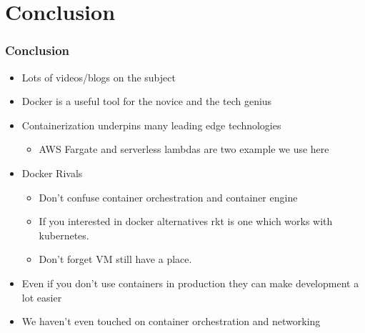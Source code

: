 \documentclass{beamer}
\begin{document}
\section{Conclusion} 
\begin{frame}
    \small
    \frametitle{Conclusion}
    \begin{itemize}
        \item Lots of videos/blogs on the subject
        \item Docker is a useful tool for the novice and the tech genius
        \item Containerization underpins many leading edge technologies
        \begin{itemize}
            \item AWS Fargate and serverless lambdas are two example we use here
        \end{itemize}    
        \item Docker Rivals
        \begin{itemize}
            \item Don't confuse container orchestration and container engine
            \item If you interested in docker alternatives rkt is one which works with kubernetes.
            \item Don't forget VM still have a place.
        \end{itemize}
        \item Even if you don't use containers in production they can make development a lot easier
        \item We haven't even touched on container orchestration and networking    
    \end{itemize}    
\end{frame}

\end{document}
